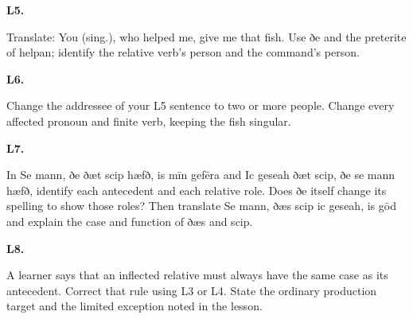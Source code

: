 \par\begin{minipage}{\linewidth}\raggedright
\textbf{L5.}

Translate: You (sing.), who helped me, give me that fish. Use ðe and the preterite of helpan; identify the relative verb’s person and the command’s person.

\end{minipage}\par\addvspace{4pt}

\par\begin{minipage}{\linewidth}\raggedright
\textbf{L6.}

Change the addressee of your L5 sentence to two or more people. Change every affected pronoun and finite verb, keeping the fish singular.

\end{minipage}\par\addvspace{4pt}

\par\begin{minipage}{\linewidth}\raggedright
\textbf{L7.}

In Se mann, ðe ðæt scip hæfð, is mīn gefēra and Ic geseah ðæt scip, ðe se mann hæfð, identify each antecedent and each relative role. Does ðe itself change its spelling to show those roles? Then translate Se mann, ðæs scip ic geseah, is gōd and explain the case and function of ðæs and scip.

\end{minipage}\par\addvspace{4pt}

\par\begin{minipage}{\linewidth}\raggedright
\textbf{L8.}

A learner says that an inflected relative must always have the same case as its antecedent. Correct that rule using L3 or L4. State the ordinary production target and the limited exception noted in the lesson.

\end{minipage}\par\addvspace{4pt}

